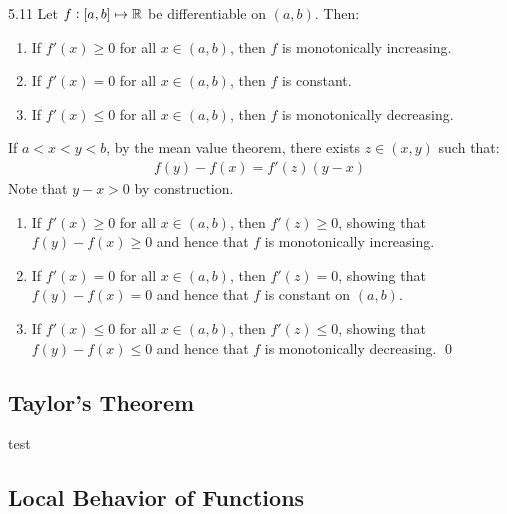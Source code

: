 \begin{theorem}{}{5.11}
    Let $f: [a, b] \mapsto \mathbb{R}$ be differentiable on $(a, b)$. Then:
    \begin{enumerate}
        \item If $f'(x) \geq 0$ for all $x \in (a, b)$, then $f$ is monotonically increasing.
        \item If $f'(x) = 0$ for all $x \in (a, b)$, then $f$ is constant. 
        \item If $f'(x) \leq 0$ for all $x \in (a, b)$, then $f$ is monotonically decreasing.
    \end{enumerate} 
\end{theorem}
\begin{nproof}
    If $a < x < y < b$, by the mean value theorem, there exists $z \in (x, y)$ such that:
    \begin{align*}
        f(y) - f(x) = f'(z)(y - x)
    \end{align*}
    Note that $y - x > 0$ by construction. 
    \begin{enumerate}
        \item If $f'(x) \geq 0$ for all $x \in (a, b)$, then $f'(z) \geq 0$, showing that $f(y) - f(x) \geq 0$ and hence that $f$ is monotonically increasing. 
        \item If $f'(x) = 0$ for all $x \in (a, b)$, then $f'(z) = 0$, showing that $f(y) - f(x) = 0$ and hence that $f$ is constant on $(a, b)$.
        \item If $f'(x) \leq 0$ for all $x \in (a, b)$, then $f'(z) \leq 0$, showing that $f(y) - f(x) \leq 0$ and hence that $f$ is monotonically decreasing. \qed
    \end{enumerate}
    
\end{nproof}

\subsection{Taylor's Theorem}
test
\subsection{Local Behavior of Functions}